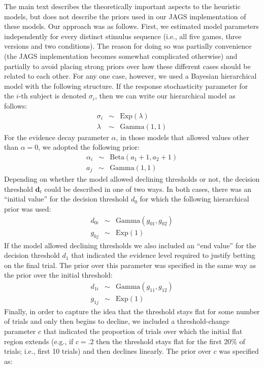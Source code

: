 \documentclass[authoryear]{elsarticle}
\begin{document}
The main text describes the theoretically important aspects to the heuristic models, but does not describe the priors used in our JAGS implementation of these models. Our approach was as follows. First, we estimated model parameters independently for every distinct stimulus sequence (i.e., all five games, three versions and two conditions). The reason for doing so was partially convenience (the JAGS implementation becomes somewhat complicated otherwise) and partially to avoid placing strong priors over how these different cases should be related to each other. For any one case, however, we used a Bayesian hierarchical model with the following structure. If the response stochasticity parameter for the $i$-th subject is denoted $\sigma_i$, then we can write our hierarchical model as follows:
$$
\begin{array}{rcl}
\sigma_i &\sim& \mbox{Exp}(\lambda) \\
\lambda &\sim& \mbox{Gamma}(1,1)
\end{array}
$$
For the evidence decay parameter $\alpha$, in those models that allowed values other than $\alpha=0$, we adopted the following prior:
$$
\begin{array}{rcl}
\alpha_i &\sim& \mbox{Beta}(a_1+1,a_2+1) \\
a_j &\sim& \mbox{Gamma}(1,1)
\end{array}
$$
Depending on whether the model allowed declining thresholds or not, the decision threshold $\bm{d}_t$ could be described in one of two ways. In both cases, there was an ``initial value'' for the decision threshold $d_{0}$ for which the following hierarchical prior was used:
$$
\begin{array}{rcl}
d_{0i} &\sim& \mbox{Gamma}(g_{01},g_{02}) \\
g_{0j} &\sim& \mbox{Exp}(1)
\end{array}
$$
If the model allowed declining thresholds we also included an ``end value'' for the decision threshold $d_{1}$ that indicated the evidence level required to justify betting on the final trial. The prior over this parameter was specified in the same way as the prior over the initial threshold:
$$
\begin{array}{rcl}
d_{1i} &\sim& \mbox{Gamma}(g_{11},g_{12}) \\
g_{1j} &\sim& \mbox{Exp}(1)
\end{array}
$$
Finally, in order to capture the idea that the threshold stays flat for some number of trials and only then begins to decline, we included a threshold-change parameter $c$ that indicated the proportion of trials over which the initial flat region extends (e.g., if $c=.2$ then the threshold stays flat for the first 20\% of trials; i.e., first 10 trials) and then declines linearly. The prior over $c$ was specified as:
\end{document}
